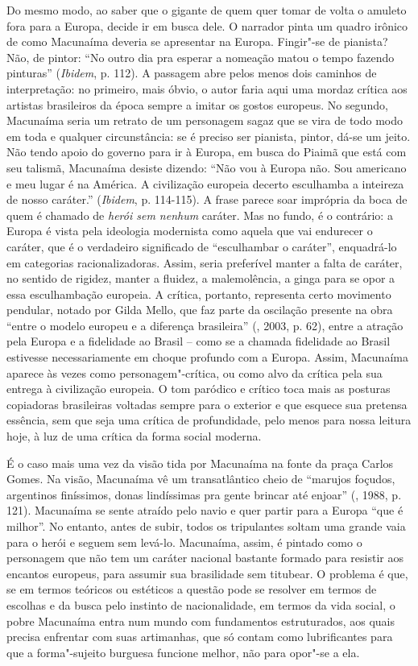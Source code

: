 Do mesmo modo, ao saber que o gigante de quem quer tomar de volta o
amuleto fora para a Europa, decide ir em busca dele. O narrador pinta um
quadro irônico de como Macunaíma deveria se apresentar na Europa.
Fingir"-se de pianista? Não, de pintor: ``No outro dia pra esperar a
nomeação matou o tempo fazendo pinturas'' (\emph{Ibidem}, p. 112). A
passagem abre pelos menos dois caminhos de interpretação: no primeiro,
mais óbvio, o autor faria aqui uma mordaz crítica aos artistas
brasileiros da época sempre a imitar os gostos europeus. No segundo,
Macunaíma seria um retrato de um personagem sagaz que se vira de todo
modo em toda e qualquer circunstância: se é preciso ser pianista,
pintor, dá-se um jeito. Não tendo apoio do governo para ir à Europa, em
busca do Piaimã que está com seu talismã, Macunaíma desiste dizendo:
``Não vou à Europa não. Sou americano e meu lugar é na América. A
civilização europeia decerto esculhamba a inteireza de nosso caráter.''
(\emph{Ibidem}, p. 114-115). A frase parece soar imprópria da boca de
quem é chamado de \emph{herói sem nenhum} caráter. Mas no fundo, é o
contrário: a Europa é vista pela ideologia modernista como aquela que
vai endurecer o caráter, que é o verdadeiro significado de ``esculhambar
o caráter'', enquadrá-lo em categorias racionalizadoras. Assim, seria
preferível manter a falta de caráter, no sentido de rigidez, manter a
fluidez, a malemolência, a ginga para se opor a essa esculhambação
europeia. A crítica, portanto, representa certo movimento pendular,
notado por Gilda Mello, que faz parte da oscilação presente na obra
``entre o modelo europeu e a diferença brasileira'' (, 2003, p.
62), entre a atração pela Europa e a fidelidade ao Brasil -- como se a
chamada fidelidade ao Brasil estivesse necessariamente em choque
profundo com a Europa. Assim, Macunaíma aparece às vezes como
personagem"-crítica, ou como alvo da crítica pela sua entrega à
civilização europeia. O tom paródico e crítico toca mais as posturas
copiadoras brasileiras voltadas sempre para o exterior e que esquece sua
pretensa essência, sem que seja uma crítica de profundidade, pelo menos
para nossa leitura hoje, à luz de uma crítica da forma social moderna.

É o caso mais uma vez da visão tida por Macunaíma na fonte da praça
Carlos Gomes. Na visão, Macunaíma vê um transatlântico cheio de
``marujos foçudos, argentinos finíssimos, donas lindíssimas pra gente
brincar até enjoar'' (, 1988, p. 121). Macunaíma se sente atraído
pelo navio e quer partir para a Europa ``que é milhor''. No entanto,
antes de subir, todos os tripulantes soltam uma grande vaia para o herói
e seguem sem levá-lo. Macunaíma, assim, é pintado como o personagem que
não tem um caráter nacional bastante formado para resistir aos encantos
europeus, para assumir sua brasilidade sem titubear. O problema é que,
se em termos teóricos ou estéticos a questão pode se resolver em termos
de escolhas e da busca pelo instinto de nacionalidade, em termos da vida
social, o pobre Macunaíma entra num mundo com fundamentos estruturados,
aos quais precisa enfrentar com suas artimanhas, que só contam como
lubrificantes para que a forma"-sujeito burguesa funcione melhor, não
para opor"-se a ela.

